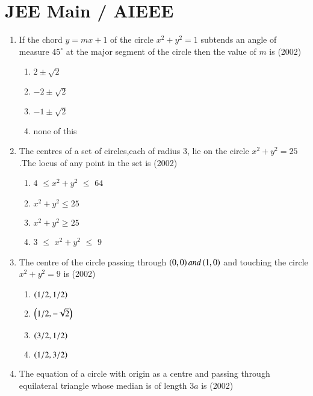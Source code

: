 \documentclass[journal,12pt,twocolumn]{IEEEtran}
\theoremstyle{remark}
\begin{document}
\section{JEE Main / AIEEE}
\begin{enumerate} 
\item If the chord $y=mx+1$ of the circle $x^2+y^2=1$ subtends an angle of measure \( 45^\circ \) at the major segment of the circle then the value of $m$ is \hfill(2002)\\
\begin{enumerate}
\item$2\pm\sqrt{2}$\\
\item$-2\pm\sqrt{2}$\\
\item$-1\pm\sqrt{2}$\\
\item none of this\\
\end{enumerate}
\item The centres of a set of circles,each of radius $3$, lie on the circle $x^2+y^2=25$.The locus of any point in the set is \hfill(2002)\\
\begin{enumerate}
\item$4$ $\leq$$x^2+y^2$ $\leq$ $64$\\
\item$x^2+y^2\leq25$\\
\item$x^2+y^2\geq25$\\
\item$3$ $\leq$ $x^2+y^2$ $\leq$ $9$\\
\end{enumerate}
\item The centre of the circle passing through $\left(0,0\right) and \left(1,0\right)$ and touching the circle $x^2+y^2=9$ is \hfill(2002)\\
\begin{enumerate}
\item$\left(1/2,1/2\right)$\\
\item$\left(1/2,-\sqrt{2}\right)$\\
\item$\left(3/2,1/2\right)$\\
\item$\left(1/2,3/2\right)$\\
\end{enumerate}
\item The equation of a circle with origin as a centre and passing through equilateral triangle whose median is of length $3a$ is \hfill(2002)\\

\end{enumerate}
\end{document}
